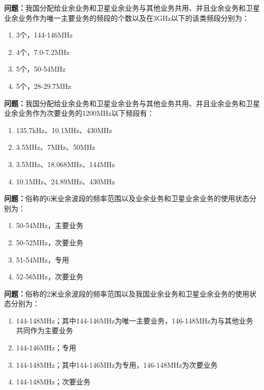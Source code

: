 \bigskip


\noindent\textbf{问题：}我国分配给业余业务和卫星业余业务与其他业务共用、并且业余业务和卫星业余业务作为唯一主要业务的频段的个数以及在3GHz以下的该类频段分别为：
\begin{enumerate}[label=\Alph*), leftmargin=3em]
\item 3个，144-146MHz
\item 4个，7.0-7.2MHz
\item 5个，50-54MHz
\item 5个，28-29.7MHz
\end{enumerate}

\bigskip


\noindent\textbf{问题：}我国分配给业余业务和卫星业余业务与其他业务共用、并且业余业务和卫星业余业务作为次要业务的1200MHz以下频段有：
\begin{enumerate}[label=\Alph*), leftmargin=3em]
\item 135.7kHz、10.1MHz、430MHz
\item 3.5MHz、7MHz、50MHz
\item 3.5MHz、18.068MHz、144MHz
\item 10.1MHz、24.89MHz、430MHz
\end{enumerate}

\bigskip


\noindent\textbf{问题：}俗称的6米业余波段的频率范围以及业余业务和卫星业余业务的使用状态分别为：
\begin{enumerate}[label=\Alph*), leftmargin=3em]
\item 50-54MHz，主要业务
\item 50-52MHz，次要业务
\item 51-54MHz，专用
\item 52-56MHz，次要业务
\end{enumerate}

\bigskip


\noindent\textbf{问题：}俗称的2米业余波段的频率范围以及我国业余业务和卫星业余业务的使用状态分别为：
\begin{enumerate}[label=\Alph*), leftmargin=3em]
\item 144-148MHz；其中144-146MHz为唯一主要业务，146-148MHz为与其他业务共同作为主要业务
\item 144-146MHz；专用
\item 144-148MHz；其中144-146MHz为专用，146-148MHz为次要业务
\item 144-148MHz；次要业务
\end{enumerate}

\bigskip


